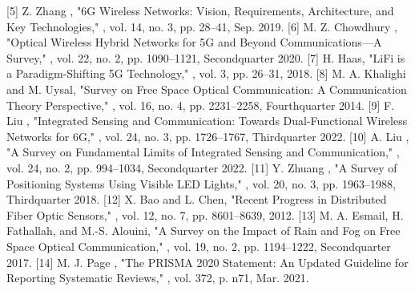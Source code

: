 {}[5] Z. Zhang , "6G Wireless Networks: Vision, Requirements, Architecture, and Key Technologies," , vol. 14, no. 3, pp. 28–41, Sep. 2019.\markdownRendererParagraphSeparator
{}[6] M. Z. Chowdhury , "Optical Wireless Hybrid Networks for 5G and Beyond Communications—A Survey," , vol. 22, no. 2, pp. 1090–1121, Secondquarter 2020.\markdownRendererParagraphSeparator
{}[7] H. Haas, "LiFi is a Paradigm-Shifting 5G Technology," , vol. 3, pp. 26–31, 2018.\markdownRendererParagraphSeparator
{}[8] M. A. Khalighi and M. Uysal, "Survey on Free Space Optical Communication: A Communication Theory Perspective," , vol. 16, no. 4, pp. 2231–2258, Fourthquarter 2014.\markdownRendererParagraphSeparator
{}[9] F. Liu , "Integrated Sensing and Communication: Towards Dual-Functional Wireless Networks for 6G," , vol. 24, no. 3, pp. 1726–1767, Thirdquarter 2022.\markdownRendererParagraphSeparator
{}[10] A. Liu , "A Survey on Fundamental Limits of Integrated Sensing and Communication," , vol. 24, no. 2, pp. 994–1034, Secondquarter 2022.\markdownRendererParagraphSeparator
{}[11] Y. Zhuang , "A Survey of Positioning Systems Using Visible LED Lights," , vol. 20, no. 3, pp. 1963–1988, Thirdquarter 2018.\markdownRendererParagraphSeparator
{}[12] X. Bao and L. Chen, "Recent Progress in Distributed Fiber Optic Sensors," , vol. 12, no. 7, pp. 8601–8639, 2012.\markdownRendererParagraphSeparator
{}[13] M. A. Esmail, H. Fathallah, and M.-S. Alouini, "A Survey on the Impact of Rain and Fog on Free Space Optical Communication," , vol. 19, no. 2, pp. 1194–1222, Secondquarter 2017.\markdownRendererParagraphSeparator
{}[14] M. J. Page , "The PRISMA 2020 Statement: An Updated Guideline for Reporting Systematic Reviews," , vol. 372, p. n71, Mar. 2021.\markdownRendererInterblockSeparator
{}\markdownRendererThematicBreak{}\markdownRendererInterblockSeparator
{}\markdownRendererParagraphSeparator
